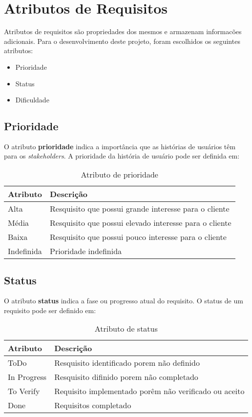 \section{Atributos de Requisitos}
	Atributos de requisitos são propriedades dos mesmos e armazenam informacões adicionais. Para o desenvolvimento deste projeto, foram escolhidos os seguintes atributos:
	\begin{itemize}
		\item Prioridade
		\item Status
		\item Dificuldade
	\end{itemize}

	\subsection{Prioridade}
	O atributo \textbf{prioridade} indica a importância que as histórias de usuários têm para os \textit{stakeholders}. A prioridade da história de usuário pode ser definida em:

	\begin{table}[htbp]
		\centering
		\begin{tabular}{|l|l|}
			\hline
			\textbf{Atributo} & \textbf{Descrição} \\ \hline
			Alta & Resquisito que possui grande interesse para o cliente \\ \hline
			Média & Resquisito que possui elevado interesse para o cliente \\ \hline
			Baixa & Resquisito que possui pouco interesse para o cliente \\ \hline
			Indefinida & Prioridade indefinida \\ \hline
		\end{tabular}
	\caption{Atributo de prioridade}
	\label{Atributo de prioridade}
	\end{table}


	\subsection{Status}
	O atributo \textbf{status} indica a fase ou progresso atual do requisito. O status de um requisito pode ser definido em:
	\begin{table}[htbp]
		\centering
		\begin{tabular}{|l|l|}
			\hline
			\textbf{Atributo} & \textbf{Descrição} \\ \hline
			ToDo & Resquisito identificado porem não definido \\ \hline
			In Progress & Resquisito difinido porem não completado \\ \hline
			To Verify & Requisito implementado porêm não verificado ou aceito \\ \hline
			Done & Requisitos completado \\ \hline
		\end{tabular}
	\caption{Atributo de status}
	\label{Atributo de status}
	\end{table}


